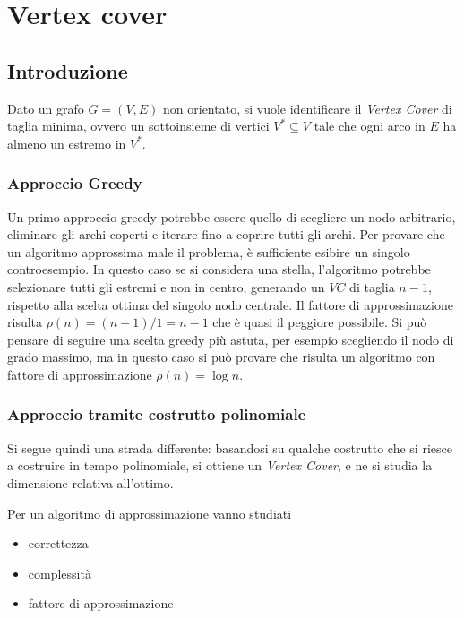 \section{Vertex cover}

\subsection{Introduzione}

Dato un grafo $G=(V,E)$ non orientato, si vuole identificare il \emph{Vertex Cover} di taglia minima, ovvero un sottoinsieme di vertici $V^* \subseteq V$ tale che ogni arco in $E$ ha almeno un estremo in $V^*$.

\subsubsection{Approccio Greedy}

Un primo approccio greedy potrebbe essere quello di scegliere un nodo arbitrario, eliminare gli archi coperti e iterare fino a coprire tutti gli archi.
Per provare che un algoritmo approssima male il problema, è sufficiente esibire un singolo controesempio.
In questo caso se si considera una stella, l'algoritmo potrebbe selezionare tutti gli estremi e non in centro, generando un $VC$ di taglia $n-1$, rispetto alla scelta ottima del singolo nodo centrale.
Il fattore di approssimazione risulta $
\rho (n) = 
(n-1)/1 = n-1
$ che è quasi il peggiore possibile.
Si può pensare di seguire una scelta greedy più astuta, per esempio scegliendo il nodo di grado massimo, ma in questo caso si può provare che risulta un algoritmo con fattore di approssimazione $
\rho (n) = \log n
$.

\subsubsection{Approccio tramite costrutto polinomiale}

Si segue quindi una strada differente: basandosi su qualche costrutto che si riesce a costruire in tempo polinomiale, si ottiene un \emph{Vertex Cover}, e ne si studia la dimensione relativa all'ottimo.

Per un algoritmo di approssimazione vanno studiati
\begin{itemize}[noitemsep,parsep=0pt,partopsep=0pt,topsep=0pt]
    \item correttezza
    \item complessità
    \item fattore di approssimazione
\end{itemize}

